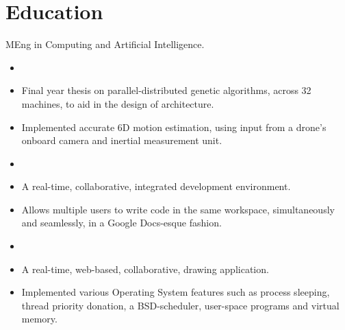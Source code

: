 \documentclass{jcgcv}
\begin{document}
\begin{column}

\section{Education}
MEng in Computing and Artificial Intelligence.

\vspace{2pt}

\begin{adjustwidth}{0.3cm}{}

\begin{itemize}
  \item {}
  \item Final year thesis on parallel-distributed genetic algorithms, across 32 machines, to aid in the design of architecture.
\end{itemize}

\begin{itemize}
  \item Implemented accurate 6D motion estimation, using input from a drone's onboard camera and inertial measurement unit.
\end{itemize}

\begin{itemize}
  \item {}
  \item A real-time, collaborative, integrated development environment.
  \item Allows multiple users to write code in the same workspace, simultaneously and seamlessly, in a Google Docs-esque fashion.
\end{itemize}

\begin{itemize}
  \item {}
  \item A real-time, web-based, collaborative, drawing application.
\end{itemize}

\begin{itemize}
  \item Implemented various Operating System features such as process sleeping, thread priority donation, a BSD-scheduler, user-space programs and virtual memory.
\end{itemize}


\end{adjustwidth}
\end{column}
\end{document}
